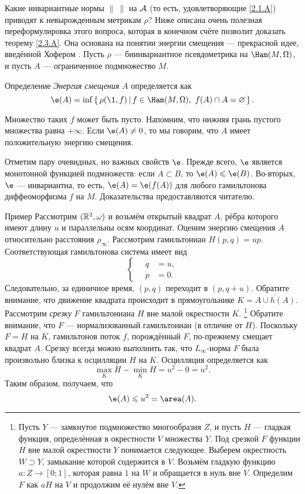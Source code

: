 Какие инвариантные нормы $\|\ \|$ на $\mathcal{A}$ (то есть, удовлетворяющие \ref{2.1.A}) приводят к невырожденным метрикам $\rho$?
Ниже описана очень полезная переформулировка этого вопроса, которая в конечном счёте позволит доказать теорему \ref{2.3.A}.
Она основана на понятии энергии смещения — прекрасной идее, введённой Хофером \cite{H1}.
Пусть $\rho$ — биинвариантное псевдометрика на $\Ham (M, \Omega)$, и пусть $A$ — ограниченное подмножество $M$.

\begin{ex*}{Определение}
\emph{Энергия смещения} $A$ определяется как 
\[\e(A) = \inf \set{\rho (\1, f)}{f \in \Ham (M, \Omega),\  f (A) \cap A = \emptyset}.\]
\end{ex*}

Множество таких $f$ может быть пусто.
Напомним, что нижняя грань пустого множества равна $+\infty$.
Если $\e (A) \ne 0$, то мы говорим, что $A$ имеет положительную энергию смещения.

Отметим пару очевидных, но важных свойств $\e$.
Прежде всего, $\e$ является монотонной функцией подмножеств: если $A \subset B$, то $\e(A) \le \e(B)$.
Во-вторых, $\e$ — инвариантна, то есть, $\e(A) = \e(f(A))$ для любого гамильтонова диффеоморфизма $f$ на $M$.
Доказательства предоставляются читателю.

\begin{ex*}{Пример}
Рассмотрим $(\mathbb{R}^2, \omega)$ и возьмём открытый квадрат $A$, рёбра которого имеют длину $u$ и параллельны осям координат.
Оценим энергию смещения $A$ относительно расстояния $\rho_\infty$.
Рассмотрим гамильтониан $H (p, q) = up$.
Соответствующая гамильтонова система имеет вид 
\[
\begin{cases}
\quad\dot q &= u,
\\
\quad\dot p &= 0.
\end{cases}
\]
Следовательно, за единичное время, $(p, q)$ переходит в $(p, q + u)$.
Обратите внимание, что движение квадрата происходит в прямоугольнике
$K = \overline{A \cup h (A)}$. 
Рассмотрим \emph{срезку} $F$ гамильтониана $H$ вне малой окрестности $K$.%
\footnote{Пусть $Y$ — замкнутое подмножество многообразия $Z$, и пусть
  $H$ — гладкая функция, определённая в окрестности $V$ множества
  $Y$. 
  Под срезкой $F$ функции $H$ вне малой окрестности $Y$ понимается следующее.
  Выберем окрестность $W\supset Y$, замыкание которой содержится в $V$.
  Возьмём гладкую функцию $a\colon Z \to [0; 1]$, которая равна $1$ на
  $W$ и обращается в нуль вне $V$. 
  Определим $F$ как $aH$ на $V$ и продолжим её нулём вне $V$.}
Обратите внимание, что $F$ — нормализованный гамильтониан (в отличие от $H$).
Поскольку $F = H$ на $K$, гамильтонов поток $f$, порождённый $F$,
по-прежнему смещает квадрат $A$. 
Срезку всегда можно выполнить так, что $L_\infty$-норма $F$ была произвольно близка к осцилляции $H$ на $K$.
Осцилляция определяется как 
\[\max_K H - \min_K H = u^2 - 0 = u^2.\]
Таким образом, получаем, что 
\[\e (A) \le u^2 = \area (A).\]
\end{ex*}

